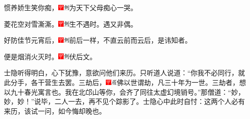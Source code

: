 惯养娇生笑你痴，{\includegraphics[width=3mm]{../Images/00002}\includegraphics[width=3mm]{../Images/00011}\footnotesize \kaishu 为天下父母痴心一哭。}

菱花空对雪澌澌。{\includegraphics[width=3mm]{../Images/00002}\includegraphics[width=3mm]{../Images/00011}\footnotesize \kaishu 生不遇时。遇又非偶。}

好防佳节元宵后，{\includegraphics[width=3mm]{../Images/00002}\includegraphics[width=3mm]{../Images/00011}\footnotesize \kaishu 前后一样，不直云前而云后，是讳知者。}

便是烟消火灭时。{\includegraphics[width=3mm]{../Images/00002}\includegraphics[width=3mm]{../Images/00011}\footnotesize \kaishu 伏后文。}

士隐听得明白，心下犹豫，意欲问他们来历。只听道人说道：``你我不必同行，就此分手，各干营生去罢。三劫后，{\includegraphics[width=3mm]{../Images/00002}\includegraphics[width=3mm]{../Images/00010}\footnotesize \kaishu 佛以世谓劫，凡三十年为一世。三劫者，想以九十春光寓言也。}我在北邙山等你，会齐了同往太虚幻境销号。''那僧道：``妙，妙，妙！''说毕，二人一去，再不见个踪影了。士隐心中此时自忖：这两个人必有来历，该试一问，如今悔却晚也。

